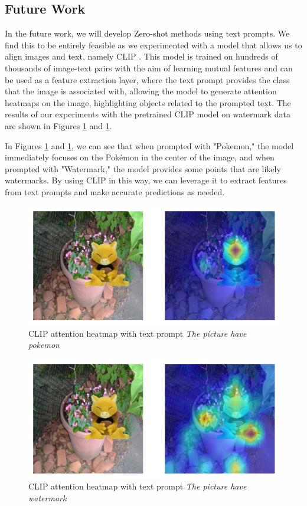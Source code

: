 \subsection{Future Work}
In the future work, we will develop Zero-shot methods using text prompts. We find this to be entirely feasible as we experimented with a model that allows us to align images and text, namely CLIP \cite{radford2021learning}. This model is trained on hundreds of thousands of image-text pairs with the aim of learning mutual features and can be used as a feature extraction layer, where the text prompt provides the class that the image is associated with, allowing the model to generate attention heatmaps on the image, highlighting objects related to the prompted text. The results of our experiments with the pretrained CLIP model on watermark data are shown in Figures \ref{fig:pic_of_pokemon} and \ref{fig:pic_of_pokemon}.

In Figures \ref{fig:pic_of_pokemon} and \ref{fig:pic_of_pokemon}, we can see that when prompted with "Pokemon," the model immediately focuses on the Pokémon in the center of the image, and when prompted with "Watermark," the model provides some points that are likely watermarks. By using CLIP in this way, we can leverage it to extract features from text prompts and make accurate predictions as needed.
\begin{figure}[t]
    \centering
    \includegraphics[width=0.75\linewidth]{img/pic_of_pokemon.png}
    \caption{CLIP attention heatmap with text prompt \textit{The picture have pokemon}}
    \label{fig:pic_of_pokemon}
\end{figure}

\begin{figure}[t]
    \centering
    \includegraphics[width=0.75\linewidth]{img/pic_of_wtm.png}
    \caption{CLIP attention heatmap with text prompt \textit{The picture have watermark}}
    \label{fig:pic_of_wtm}
\end{figure}

